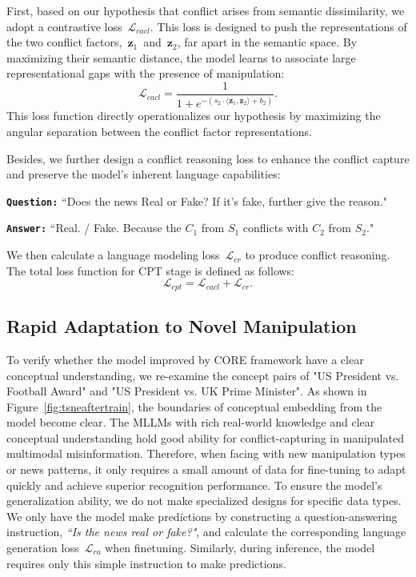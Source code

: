 \documentclass{article}
\theoremstyle{plain}
\theoremstyle{definition}
\theoremstyle{remark}
\begin{document}
First, based on our hypothesis that conflict arises from semantic dissimilarity, we adopt a contrastive loss~$\mathcal{L}_{cacl}$. This loss is designed to push the representations of the two conflict factors,~$\mathbf{z}_1$~and~$\mathbf{z}_2$, far apart in the semantic space. By maximizing their semantic distance, the model learns to associate large representational gaps with the presence of manipulation:
\begin{equation}
\mathcal{L}_{cacl} = \frac{1}{1 + e^{-(s_2 \cdot \langle \mathbf{z}_1, \mathbf{z}_2 \rangle + b_2)}}.
\label{eq:stage2_contrastive_loss}
\end{equation}
This loss function directly operationalizes our hypothesis by maximizing the angular separation between the conflict factor representations.

Besides, we further design a conflict reasoning loss to enhance the conflict capture and preserve the model's inherent language capabilities:

\noindent\texttt{\textbf{Question:}} ``Does the news Real or Fake? If it's fake, further give the reason."

\noindent\texttt{\textbf{Answer:}} ``Real. / Fake. Because the $C_1$ from $S_1$ conflicts with $C_2$ from $S_2$."

We then calculate a language modeling loss~$\mathcal{L}_{cr}$ to produce conflict reasoning. The total loss function for CPT stage is defined as follows:
\begin{equation}
\mathcal{L}_{cpt} = \mathcal{L}_{cacl} + \mathcal{L}_{cr}.
\label{eq:stage2_loss}
\end{equation}





\subsection{Rapid Adaptation to Novel Manipulation}
To verify whether the model improved by CORE framework have a clear conceptual understanding, we re-examine the concept pairs of "US President vs. Football Award" and "US President vs. UK Prime Minister". As shown in  Figure~\ref{fig:tsneaftertrain}, the boundaries of conceptual embedding from the model become clear. The MLLMs with rich real-world knowledge and clear conceptual understanding hold good ability for conflict-capturing in manipulated multimodal misinformation.
Therefore, when facing with new manipulation types or news patterns, it only requires a small amount of data for fine-tuning to adapt quickly and achieve superior recognition performance. To ensure the model's generalization ability, we do not make specialized designs for specific data types. We only have the model make predictions by constructing a question-answering instruction, \textit{``Is the news real or fake?"}, and calculate the corresponding language generation loss~$\mathcal{L}_{ra}$ when finetuning. Similarly, during inference, the model requires only this simple instruction to make predictions.
\end{document}
